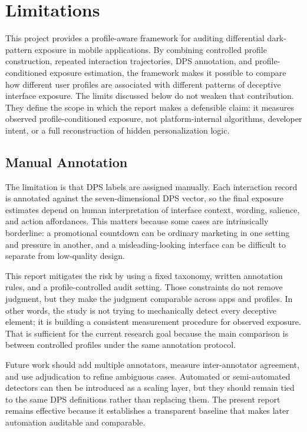 \chapter{Limitations}

This project provides a profile-aware framework for auditing differential dark-pattern exposure in mobile applications. By combining controlled profile construction, repeated interaction trajectories, DPS annotation, and profile-conditioned exposure estimation, the framework makes it possible to compare how different user profiles are associated with different patterns of deceptive interface exposure. The limits discussed below do not weaken that contribution. They define the scope in which the report makes a defensible claim: it measures observed profile-conditioned exposure, not platform-internal algorithms, developer intent, or a full reconstruction of hidden personalization logic.

\section{Manual Annotation}

The limitation is that DPS labels are assigned manually. Each interaction record is annotated against the seven-dimensional DPS vector, so the final exposure estimates depend on human interpretation of interface context, wording, salience, and action affordances. This matters because some cases are intrinsically borderline: a promotional countdown can be ordinary marketing in one setting and pressure in another, and a misleading-looking interface can be difficult to separate from low-quality design.

This report mitigates the risk by using a fixed taxonomy, written annotation rules, and a profile-controlled audit setting. Those constraints do not remove judgment, but they make the judgment comparable across apps and profiles. In other words, the study is not trying to mechanically detect every deceptive element; it is building a consistent measurement procedure for observed exposure. That is sufficient for the current research goal because the main comparison is between controlled profiles under the same annotation protocol.

Future work should add multiple annotators, measure inter-annotator agreement, and use adjudication to refine ambiguous cases. Automated or semi-automated detectors can then be introduced as a scaling layer, but they should remain tied to the same DPS definitions rather than replacing them. The present report remains effective because it establishes a transparent baseline that makes later automation auditable and comparable.

